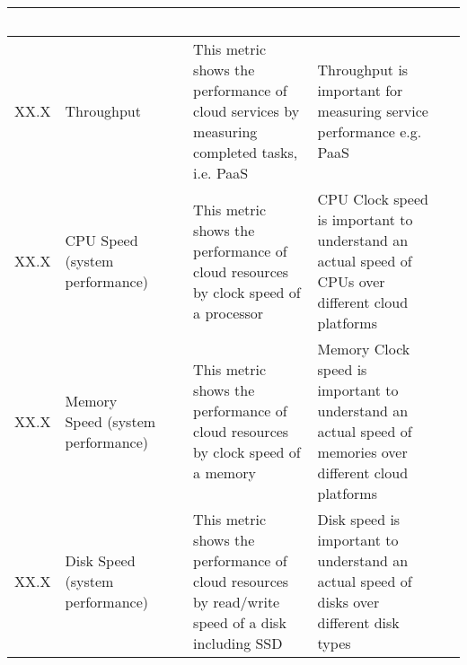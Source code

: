 \begin{table*}[p]
\begin{scriptsize}
\begin{center}
\begin{tabular}{lp{}p{}p{}p{}p{}}
~ \\
\hline
XX.X &
Throughput &
~&
This metric shows the performance of cloud services by measuring completed tasks, i.e. PaaS &
Throughput is important for measuring service performance e.g. PaaS &
~ \\
\hline
XX.X &
CPU Speed (system performance)&
~&
This metric shows the performance of cloud resources by clock speed of a processor &
CPU Clock speed is important to understand an actual speed of CPUs over different cloud platforms &
~ \\
\hline
XX.X &
Memory Speed (system performance)&
~&
This metric shows the performance of cloud resources by clock speed of a memory &
Memory Clock speed is important to understand an actual speed of memories over different cloud platforms &
~ \\
\hline
XX.X &
Disk Speed (system performance)&
~&
This metric shows the performance of cloud resources by read/write speed of a disk including SSD &
Disk speed is important to understand an actual speed of disks over different disk types&
~ \\
\hline
\end{tabular}
\end{center}
\end{scriptsize}
\end{table*}

